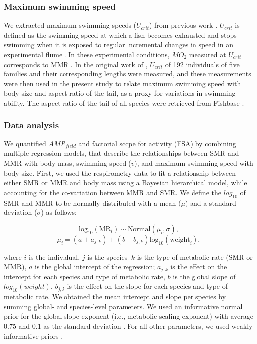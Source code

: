 \documentclass[
]{article}
\begin{document}
\hypertarget{maximum-swimming-speed}{%
\subsubsection{Maximum swimming speed}\label{maximum-swimming-speed}}

We extracted maximum swimming speeds (\(U_{crit}\)) from previous work
\citep{Fulton2007}. \(U_{crit}\) is defined as the swimming speed at
which a fish becomes exhausted and stops swimming when it is exposed to
regular incremental changes in speed in an experimental flume
\citep{Brett1964}. In these experimental conditions, \(\dot{M}O_{2}\)
measured at \(U_{crit}\) corresponds to MMR \citep{Norin2016}. In the
original work of \citet{Fulton2007}, \(U_{crit}\) of 192 individuals of
five families and their corresponding lengths were measured, and these
measurements were then used in the present study to relate maximum
swimming speed with body size and aspect ratio of the tail, as a proxy
for variations in swimming ability. The aspect ratio of the tail of all
species were retrieved from Fishbase \citep{Froese2014}.

\hypertarget{data-analysis}{%
\subsubsection{Data analysis}\label{data-analysis}}

We quantified \(AMR_{field}\) and factorial scope for activity (FSA) by
combining multiple regression models, that describe the relationships
between SMR and MMR with body mass, swimming speed (\(v\)), and maximum
swimming speed \citep[\(v_{max}\); from][]{Fulton2007} with body size.
First, we used the respirometry data to fit a relationship between
either SMR or MMR and body mass using a Bayesian hierarchical model,
while accounting for the co-variation between MMR and SMR. We define the
\(log_{10}\) of SMR and MMR to be normally distributed with a mean
(\(\mu\)) and a standard deviation (\(\sigma\)) as follows:

\[{{\textrm{log}}_{10}{(\textrm{MR}_{i})}} \sim {\textrm{Normal}(\mu_{i}, \sigma)},\]
\[\mu_{i} = (a + a_{j,k}) + (b + b_{j,k}){\textrm{log}_{10}(\textrm{weight}_i)}, \]

where \(i\) is the individual, \(j\) is the species, \(k\) is the type
of metabolic rate (SMR or MMR), \(a\) is the global intercept of the
regression; \(a_{j,k}\) is the effect on the intercept for each species
and type of metabolic rate, \(b\) is the global slope of
\(log_{10}(weight)\), \(b_{j,k}\) is the effect on the slope for each
species and type of metabolic rate. We obtained the mean intercept and
slope per species by summing global- and species-level parameters. We
used an informative normal prior for the global slope exponent (i.e.,
metabolic scaling exponent) with average 0.75 and 0.1 as the standard
deviation \citep{West1997}. For all other parameters, we used weakly
informative priors \citep{Burkner2017}.
\end{document}
